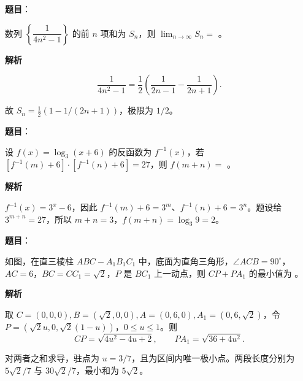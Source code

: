 \begin{answer}

\textbf{题目}：

数列 $\left\{\dfrac1{4n^2-1}\right\}$ 的前 $n$ 项和为 $S_n$，则 $\lim_{n\to\infty}S_n=$ \gkblank{}。

\textbf{解析}

\nopagebreak[4]
\[
\frac1{4n^2-1}=\frac12\left(\frac1{2n-1}-\frac1{2n+1}\right).
\]

故 $S_n=\frac12(1-1/(2n+1))$，极限为 $1/2$。


\end{answer}
\begin{answer}

\textbf{题目}：

设 $f(x)=\log_3(x+6)$ 的反函数为 $f^{-1}(x)$，若 $[f^{-1}(m)+6]\cdot[f^{-1}(n)+6]=27$，则 $f(m+n)=$ \gkblank{}。

\textbf{解析}

$f^{-1}(x)=3^x-6$，因此 $f^{-1}(m)+6=3^m$、$f^{-1}(n)+6=3^n$。题设给 $3^{m+n}=27$，所以 $m+n=3$，$f(m+n)=\log_3 9=2$。


\end{answer}
\begin{answer}

\textbf{题目}：

如图，在直三棱柱 $ABC-A_1B_1C_1$ 中，底面为直角三角形，$\angle ACB=90^\circ$，$AC=6\text{，}BC=CC_1=\sqrt2$，$P$ 是 $BC_1$ 上一动点，则 $CP+PA_1$ 的最小值为 \gkblank{}。
\nopagebreak[4]
\begin{center}\end{center}
\nopagebreak[4]
\textbf{解析}

取 $C=(0,0,0),B=(\sqrt2,0,0),A=(0,6,0),A_1=(0,6,\sqrt2)$，令 $P=(\sqrt2u,0,\sqrt2(1-u))$，$0\le u\le1$。则
\nopagebreak[4]
\[
CP=\sqrt{4u^2-4u+2},\qquad PA_1=\sqrt{36+4u^2}.
\]

对两者之和求导，驻点为 $u=3/7$，且为区间内唯一极小点。两段长度分别为 $5\sqrt2/7$ 与 $30\sqrt2/7$，最小和为 $5\sqrt2$。


\end{answer}
